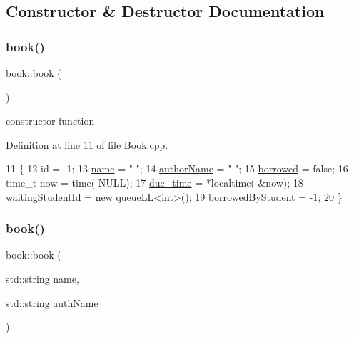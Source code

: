 \subsection{Constructor \& Destructor Documentation}
\mbox{\label{classbook_ad081661f16222b7195ff4342ba4fdf04}} 
\subsubsection{\texorpdfstring{book()}{book()}\hspace{0.1cm}{\footnotesize\ttfamily [1/2]}}
{\footnotesize\ttfamily book\+::book (\begin{DoxyParamCaption}{ }\end{DoxyParamCaption})}

constructor function 

Definition at line 11 of file Book.\+cpp.


\begin{DoxyCode}
11            \{
12     \textcolor{keywordtype}{id} = -1;
13     \hyperlink{classbook_a5eabc1c1c5abff26997bec3d41f90d9e}{name} = \textcolor{stringliteral}{" "};
14     \hyperlink{classbook_a21b2962c6227818732db27f12121b732}{authorName} = \textcolor{stringliteral}{" "};
15     \hyperlink{classbook_ab745520ed537e69bde6f2e3d7a103276}{borrowed} = \textcolor{keyword}{false};
16     time\_t now = time( NULL);
17     \hyperlink{classbook_abf72d9a32cdadee632df5a626dbe33b8}{due\_time} = *localtime( &now);
18     \hyperlink{classbook_a40ce04fcfbf99ffdbe7a4e1463588ee5}{waitingStudentId} = \textcolor{keyword}{new} \hyperlink{classqueue_l_l}{queueLL<int>}();
19     \hyperlink{classbook_afa5350900be6a34d8301a57d6db54df5}{borrowedByStudent} = -1;
20 \}
\end{DoxyCode}
\mbox{\label{classbook_af51e1b11131e522f13d5c4b52a3eed03}} 
\subsubsection{\texorpdfstring{book()}{book()}\hspace{0.1cm}{\footnotesize\ttfamily [2/2]}}
{\footnotesize\ttfamily book\+::book (\begin{DoxyParamCaption}\item[{std\+::string}]{name,  }\item[{std\+::string}]{auth\+Name }\end{DoxyParamCaption})}

